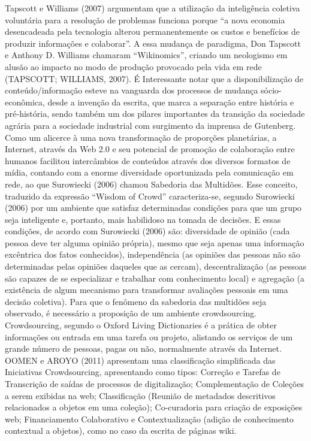 Tapscott e Williams (2007) argumentam que a utilização da inteligência coletiva voluntária para a resolução de problemas funciona porque “a nova economia desencadeada pela tecnologia alterou permanentemente os custos e benefícios de produzir informações e colaborar”. A essa mudança de paradigma, Don Tapscott e Anthony D. Williams chamaram “Wikinomics”, criando um neologismo em alusão ao impacto no modo de produção provocado pela vida em rede (TAPSCOTT; WILLIAMS, 2007). 
É Interessante notar que a disponibilização de conteúdo/informação esteve na vanguarda dos processos de mudança sócio-econômica, desde a invenção da escrita, que marca a separação entre história e pré-história, sendo também um dos pilares importantes da transição da sociedade agrária para a sociedade industrial com surgimento da imprensa de Gutenberg. 
Como um alicerce à uma nova transformação de proporções planetárias,  a Internet, através da Web 2.0 e seu potencial de promoção de colaboração entre humanos facilitou intercâmbios de conteúdos através dos diversos formatos de mídia, contando com a enorme diversidade oportunizada pela comunicação em rede, ao que Surowiecki (2006) chamou Sabedoria das Multidões. Esse conceito, traduzido da expressão “Wisdom of Crowd” caracteriza-se, segundo Surowiecki (2006) por um ambiente que satisfaz determinadas condições para que um grupo seja inteligente e, portanto, mais habilidoso na tomada de decisões. 
E essas condições, de acordo com Surowiecki (2006) são: diversidade de opinião (cada pessoa deve ter alguma opinião própria), mesmo que seja apenas uma informação excêntrica dos fatos conhecidos), independência (as opiniões das pessoas não são determinadas pelas opiniões daqueles que as cercam), descentralização (as pessoas são capazes de se especializar e trabalhar com conhecimento local) e agregação (a existência de algum mecanismo para transformar avaliações pessoais em uma decisão coletiva). 
Para que o fenômeno da sabedoria das multidões seja observado, é necessário a proposição de um ambiente crowdsourcing. Crowdsourcing, segundo o Oxford Living Dictionaries é a prática de obter informações ou entrada em uma tarefa ou projeto, alistando os serviços de um grande número de pessoas, pagas ou não, normalmente através da Internet. 
OOMEN e AROYO (2011) apresentam uma classificação simplificada das Iniciativas Crowdsourcing, apresentando como tipos: Correção e Tarefas de Transcrição de saídas de processos de digitalização; Complementação de Coleções a serem exibidas na web; Classificação (Reunião de metadados descritivos relacionados a objetos em uma coleção); Co-curadoria para criação de exposições web; Financiamento Colaborativo e Contextualização (adição de conhecimento contextual a objetos), como no caso da escrita de páginas wiki. 
